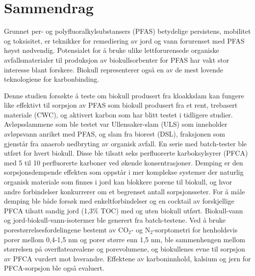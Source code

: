 \newpage
{}
\section*{Sammendrag}
Grunnet per- og polyfluoralkylsubstansers (PFAS) betydelige persistens, mobilitet og toksisitet, er teknikker for remediering av jord og vann forurenset med PFAS høyst nødvendig. Potensialet for å bruke ulike lettforurensede organiske avfallsmaterialer til produksjon av biokullsorbenter for PFAS har vakt stor interesse blant forskere. Biokull representerer også en av de mest lovende teknologiene for karbonbinding.

Denne studien forsøkte å teste om biokull produsert fra kloakkslam kan fungere like effektivt til sorpsjon av PFAS som biokull produsert fra et rent, trebasert materiale (CWC), og aktivert karbon som har blitt testet i tidligere studier. Avløpsslammene som ble testet var Ullensaker-slam (ULS) som inneholder avløpsvann anriket med PFAS, og slam fra biorest (DSL), fraksjonen som gjenstår fra anaerob nedbryting av organisk avfall. En serie med batch-tester ble utført for hvert biokull. Disse ble tilsatt seks perfluorerte karboksylsyrer (PFCA) med 5 til 10 perfluorerte karboner ved økende konsentrasjoner. Demping er den sorpsjonsdempende effekten som oppstår i mer komplekse systemer der naturlig organisk materiale som finnes i jord kan blokkere porene til biokull, og hvor andre forbindelser konkurrerer om et begrenset antall sorpsjonsseter. For å måle demping ble både forsøk med enkeltforbindelser og en cocktail av forskjellige PFCA tilsatt sandig jord (1,3\% TOC) med og uten biokull utført. Biokull-vann og jord-biokull-vann-isotermer ble generert fra batch-testene. Ved å bruke porestørrelsesfordelingene bestemt av $\mathrm{CO_2}$- og $\mathrm{N_2}$-sorptometri for henholdsvis porer mellom 0,4-1,5 nm og porer større enn 1,5 nm, ble sammenhengen mellom størrelsen på overflatearealene og porevolumene, og biokullenes evne til sorpsjon av PFCA vurdert mot hverandre. Effektene av karboninnhold, kalsium og jern for PFCA-sorpsjon ble også evaluert.

